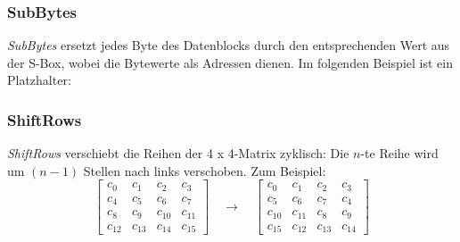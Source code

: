 \subsubsection{SubBytes}
\textit{SubBytes} ersetzt jedes Byte des Datenblocks durch den entsprechenden Wert aus der S-Box, wobei die Bytewerte als Adressen dienen. Im folgenden Beispiel 
ist  ein Platzhalter:
\begin{table}[H]
    \caption{Ausschnitt einer S-Box im AES-Algorithmus}
\end{table}



\subsubsection{ShiftRows}
\textit{ShiftRows} verschiebt die Reihen der 4 x 4-Matrix zyklisch: Die $n$-te Reihe wird um $(n-1)$ Stellen nach links verschoben. Zum Beispiel:
\[
\begin{bmatrix}
c_0  & c_1  & c_2  & c_3  \\
c_4  & c_5  & c_6  & c_7  \\
c_8  & c_9  & c_{10} & c_{11} \\
c_{12} & c_{13} & c_{14} & c_{15}
\end{bmatrix}
\quad\rightarrow\quad
\begin{bmatrix}
c_0  & c_1  & c_2  & c_3  \\
c_5  & c_6  & c_7  & c_4  \\
c_{10} & c_{11} & c_8  & c_9  \\
c_{15} & c_{12} & c_{13} & c_{14}
\end{bmatrix}
\]

